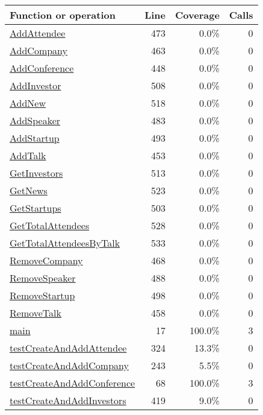 \begin{longtable}{|l|r|r|r|}
\hline
Function or operation & Line & Coverage & Calls \\
\hline
\hline
\hyperref[AddAttendee:473]{AddAttendee} & 473&0.0\% & 0 \\
\hline
\hyperref[AddCompany:463]{AddCompany} & 463&0.0\% & 0 \\
\hline
\hyperref[AddConference:448]{AddConference} & 448&0.0\% & 0 \\
\hline
\hyperref[AddInvestor:508]{AddInvestor} & 508&0.0\% & 0 \\
\hline
\hyperref[AddNew:518]{AddNew} & 518&0.0\% & 0 \\
\hline
\hyperref[AddSpeaker:483]{AddSpeaker} & 483&0.0\% & 0 \\
\hline
\hyperref[AddStartup:493]{AddStartup} & 493&0.0\% & 0 \\
\hline
\hyperref[AddTalk:453]{AddTalk} & 453&0.0\% & 0 \\
\hline
\hyperref[GetInvestors:513]{GetInvestors} & 513&0.0\% & 0 \\
\hline
\hyperref[GetNews:523]{GetNews} & 523&0.0\% & 0 \\
\hline
\hyperref[GetStartups:503]{GetStartups} & 503&0.0\% & 0 \\
\hline
\hyperref[GetTotalAttendees:528]{GetTotalAttendees} & 528&0.0\% & 0 \\
\hline
\hyperref[GetTotalAttendeesByTalk:533]{GetTotalAttendeesByTalk} & 533&0.0\% & 0 \\
\hline
\hyperref[RemoveCompany:468]{RemoveCompany} & 468&0.0\% & 0 \\
\hline
\hyperref[RemoveSpeaker:488]{RemoveSpeaker} & 488&0.0\% & 0 \\
\hline
\hyperref[RemoveStartup:498]{RemoveStartup} & 498&0.0\% & 0 \\
\hline
\hyperref[RemoveTalk:458]{RemoveTalk} & 458&0.0\% & 0 \\
\hline
\hyperref[main:17]{main} & 17&100.0\% & 3 \\
\hline
\hyperref[testCreateAndAddAttendee:324]{testCreateAndAddAttendee} & 324&13.3\% & 0 \\
\hline
\hyperref[testCreateAndAddCompany:243]{testCreateAndAddCompany} & 243&5.5\% & 0 \\
\hline
\hyperref[testCreateAndAddConference:68]{testCreateAndAddConference} & 68&100.0\% & 3 \\
\hline
\hyperref[testCreateAndAddInvestors:419]{testCreateAndAddInvestors} & 419&9.0\% & 0 \\

\end{longtable}
